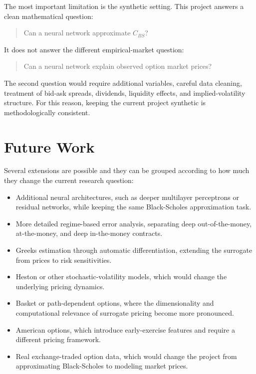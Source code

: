 The most important limitation is the synthetic setting.
This project answers a clean mathematical question:

\begin{quote}
    Can a neural network approximate $C_{BS}$?
\end{quote}

It does not answer the different empirical-market question:

\begin{quote}
    Can a neural network explain observed option market prices?
\end{quote}

The second question would require additional variables, careful data cleaning, treatment of bid-ask spreads, dividends, liquidity effects, and implied-volatility structure.
For this reason, keeping the current project synthetic is methodologically consistent.

\section{Future Work}

Several extensions are possible and they can be grouped according to how much they change the current research question:

\begin{itemize}
    \item Additional neural architectures, such as deeper multilayer perceptrons or residual networks, while keeping the same Black-Scholes approximation task.
    \item More detailed regime-based error analysis, separating deep out-of-the-money, at-the-money, and deep in-the-money contracts.
    \item Greeks estimation through automatic differentiation, extending the surrogate from prices to risk sensitivities.
    \item Heston or other stochastic-volatility models, which would change the underlying pricing dynamics.
    \item Basket or path-dependent options, where the dimensionality and computational relevance of surrogate pricing become more pronounced.
    \item American options, which introduce early-exercise features and require a different pricing framework.
    \item Real exchange-traded option data, which would change the project from approximating Black-Scholes to modeling market prices.
\end{itemize}

